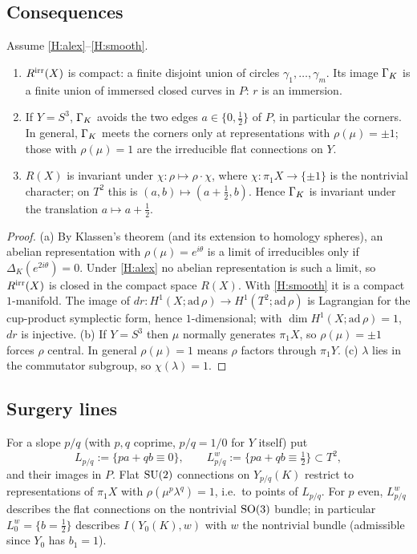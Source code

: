 \subsection{Consequences}
\begin{proposition}\label{prop:basic}
Assume \ref{H:alex}--\ref{H:smooth}.
\begin{enumerate}[label=(\alph*)]
\item $R^{\rm irr}(X)$ is compact: a finite disjoint union of circles $\gamma_1,\dots,\gamma_m$.  Its image $\Gamma_K$ is a
finite union of immersed closed curves in $P$: $r$ is an immersion.
\item If $Y=S^3$, $\Gamma_K$ avoids the two edges $a\in\{0,\tfrac12\}$ of $P$, in particular the corners.  In general, $\Gamma_K$ meets the corners only at representations
with $\rho(\mu)=\pm1$; those with $\rho(\mu)=1$ are the irreducible flat connections on $Y$.
\item $R(X)$ is invariant under $\chi\colon\rho\mapsto\rho\cdot\chi$, where $\chi\colon\pi_1X\to\{\pm1\}$ is the
nontrivial character; on $T^2$ this is $(a,b)\mapsto(a+\tfrac12,b)$.  Hence $\Gamma_K$ is invariant under the
translation $a\mapsto a+\tfrac12$.
\end{enumerate}
\end{proposition}
\begin{proof}
(a) By Klassen's theorem (and its extension to homology spheres), an abelian representation with
$\rho(\mu)=e^{i\theta}$ is a limit of irreducibles only if $\Delta_K(e^{2i\theta})=0$.  Under \ref{H:alex} no abelian
representation is such a limit, so $R^{\rm irr}(X)$ is closed in the compact space $R(X)$.  With \ref{H:smooth} it is a
compact $1$-manifold.  The image of $dr\colon H^1(X;\mathrm{ad}\,\rho)\to H^1(T^2;\mathrm{ad}\,\rho)$ is Lagrangian for
the cup-product symplectic form, hence $1$-dimensional; with $\dim H^1(X;\mathrm{ad}\,\rho)=1$, $dr$ is injective.
(b) If $Y=S^3$ then $\mu$ normally generates $\pi_1X$, so $\rho(\mu)=\pm1$ forces $\rho$ central.  In general
$\rho(\mu)=1$ means $\rho$ factors through $\pi_1Y$.  (c) $\lambda$ lies in the commutator subgroup, so $\chi(\lambda)=1$.
\end{proof}

\subsection{Surgery lines}
For a slope $p/q$ (with $p,q$ coprime, $p/q=1/0$ for $Y$ itself) put
\[
L_{p/q}:=\{pa+qb\equiv0\},\qquad L^w_{p/q}:=\{pa+qb\equiv\tfrac12\}\subset T^2,
\]
and their images in $P$.  Flat $\operatorname{SU}(2)$ connections on $Y_{p/q}(K)$ restrict to representations of $\pi_1X$ with
$\rho(\mu^p\lambda^q)=1$, i.e.\ to points of $L_{p/q}$.  For $p$ even, $L^w_{p/q}$ describes the flat connections on
the nontrivial $\operatorname{SO}(3)$ bundle; in particular $L^w_{0}=\{b=\tfrac12\}$ describes $I(Y_0(K),w)$ with $w$ the
nontrivial bundle (admissible since $Y_0$ has $b_1=1$).


